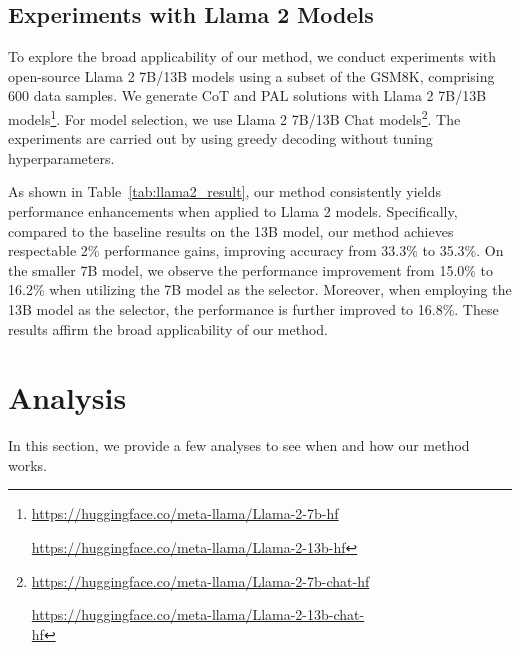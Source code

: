 \documentclass[11pt]{article}
\newcommand{\hf}{\hat f}
\begin{document}
\subsection{Experiments with Llama 2 Models}

To explore the broad applicability of our method, we conduct experiments with open-source Llama 2 7B/13B models using a subset of the GSM8K, comprising 600 data samples. We generate CoT and PAL solutions with Llama 2 7B/13B models\footnote{\href{https://huggingface.co/meta-llama/Llama-2-7b-hf}{https://huggingface.co/meta-llama/Llama-2-7b-hf}\par \quad \href{https://huggingface.co/meta-llama/Llama-2-13b-hf}{https://huggingface.co/meta-llama/Llama-2-13b-hf}}. For model selection, we use Llama 2 7B/13B Chat models\footnote{
\href{https://huggingface.co/meta-llama/Llama-2-7b-chat-hf}{https://huggingface.co/meta-llama/Llama-2-7b-chat-hf} \par \quad \href{https://huggingface.co/meta-llama/Llama-2-13b-chat-hf}{https://huggingface.co/meta-llama/Llama-2-13b-chat-\\hf}}. The experiments are carried out by using greedy decoding without tuning hyperparameters.

As shown in Table~\ref{tab:llama2_result}, our method consistently yields performance enhancements when applied to Llama 2 models. Specifically, compared to the baseline results on the 13B model, our method achieves respectable 2\% performance gains, improving accuracy from 33.3\% to 35.3\%. On the smaller 7B model, we observe the performance improvement from 15.0\% to 16.2\% when utilizing the 7B model as the selector. Moreover, when employing the 13B model as the selector, the performance is further improved to 16.8\%. These results affirm the broad applicability of our method.

\section{Analysis}
In this section, we provide a few analyses to see when and how our method works.
\end{document}
